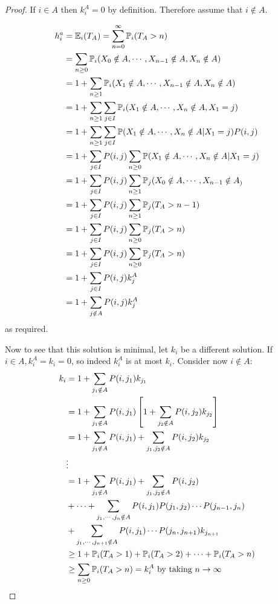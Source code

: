 \documentclass[../Main.tex]{subfiles}
\begin{document}
\begin{proof}
    If $i \in A$ then $k_i^A = 0$ by definition. Therefore assume that $i \notin A$.

    \begin{align*}
        h_i^a &= \E_i(T_A) = \sum_{n = 0}^\infty \P_i(T_A > n)\\
        &= \sum_{n \geq 0} \P_i(X_0 \notin A, \cdots, X_{n-1} \notin A, X_n \notin A) \\
        &= 1 + \sum_{n \geq 1} \P_i(X_1 \notin A, \cdots, X_{n-1} \notin A, X_n \notin A) \\
        &= 1 + \sum_{n \geq 1} \sum_{j \in I}\P_i (X_1 \notin A, \cdots, X_n \notin A, X_1 = j) \\
        &= 1 + \sum_{n \geq 1} \sum_{j \in I}\P(X_1 \notin A, \cdots, X_n \notin A | X_1 = j)P(i, j) \\
        &= 1 + \sum_{j \in I} P(i, j) \sum_{n \geq 0} \P(X_1 \notin A, \cdots, X_n \notin A | X_1 = j) \\
        &= 1 + \sum_{j \in I} P(i, j) \sum_{n \geq 1} \P_j(X_0 \notin A, \cdots, X_{n-1} \notin A_) \\
        &= 1 + \sum_{j \in I} P(i, j) \sum_{n \geq 1} \P_j(T_A > n-1) \\
        &= 1 + \sum_{j \in I} P(i, j) \sum_{n \geq 0} \P_j(T_A > n) \\
        &= 1 + \sum_{j \in I} P(i, j) \sum_{n \geq 0} \P_j(T_A > n) \\
        &= 1 + \sum_{j \in I} P(i, j) k_j^A \\
        &= 1 + \sum_{j \notin A} P(i, j) k_j^A \\
    \end{align*}
    as required.

    Now to see that this solution is minimal, let $k_i$ be a different solution.  If $i \in A, k_i^A = k_i = 0$, so indeed $k_i^A$ is at most $k_i$. Consider now $i \notin A$:
    \begin{align*}
        k_i &= 1 + \sum_{j_1 \notin A} P(i, j_1) k_{j_1} \\
        &= 1 + \sum_{j_1 \notin A} P(i, j_1) \left[1 + \sum_{j_2 \notin A} P(i, j_2) k_{j_2}\right] \\
        &= 1 + \sum_{j_1 \notin A} P(i, j_1) + \sum_{j_1, j_2 \notin A} P(i, j_2) k_{j_2} \\
        &\vdots \\
        &= 1 + \sum_{j_1 \notin A} P(i, j_1) + \sum_{j_1, j_2 \notin A} P(i, j_2) \\
        &+ \cdots + \sum_{j_1, \cdots, j_n \notin A} P(i, j_1) P(j_1, j_2) \cdots P(j_{n-1}, j_n) \\
        &+ \sum_{j_1, \cdots, j_{n+1} \notin A} P(i, j_1) \cdots P(j_n, j_{n+1}) k_{j_{n+1}} \\
        &\geq 1 + \P_i(T_A > 1) + \P_i(T_A > 2) + \cdots + \P_i(T_A > n) \\
        &\geq \sum_{n \geq 0} \P_i(T_A > n) = k_i^A \text{ by taking } n \to \infty
    \end{align*}
\end{proof}
\end{document}
